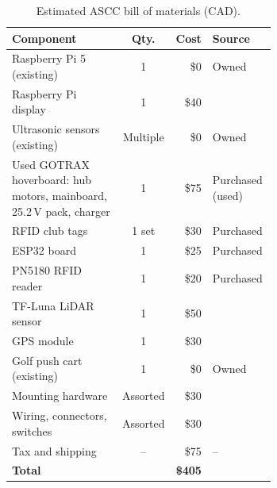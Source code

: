 \label{app:budget}

\begin{table}[H]
\centering
\caption{Estimated ASCC bill of materials (CAD).}
\label{tab:resource-budget}
\small
\begin{tabular}{p{0.42\linewidth} c r p{0.24\linewidth}}
\hline
\textbf{Component} & \textbf{Qty.} & \textbf{Cost} & \textbf{Source} \\
\hline
Raspberry Pi 5 (existing) & 1 & \$0 & Owned \\
Raspberry Pi display & 1 & \$40 & ~\cite{waveshareDisplay} \\
Ultrasonic sensors (existing) & Multiple & \$0 & Owned \\
Used GOTRAX hoverboard: hub motors, mainboard, 25.2\,V pack, charger & 1 & \$75 & Purchased (used) \\
\acs{RFID} club tags & 1 set & \$30 & Purchased \\
ESP32 board & 1 & \$25 & Purchased \\
PN5180 \acs{RFID} reader & 1 & \$20 & Purchased \\
TF-Luna \acs{LiDAR} sensor & 1 & \$50 & ~\cite{robotshopTfluna} \\
\acs{GPS} module & 1 & \$30 & ~\cite{rotorgeeksGps} \\
Golf push cart (existing) & 1 & \$0 & Owned \\
Mounting hardware & Assorted & \$30 & ~\cite{digikeyCanada} \\
Wiring, connectors, switches & Assorted & \$30 & ~\cite{digikeyCanada} \\
Tax and shipping & -- & \$75 & -- \\
\hline
\textbf{Total} & & \textbf{\$405} & \\
\hline
\end{tabular}
\end{table}
